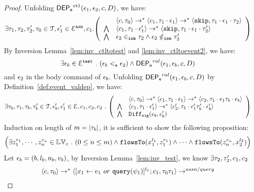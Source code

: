 {\begin{proof}
Unfolding $\mathsf{DEP_{\mathtt{e}}}^{\mathtt{{ctl}}}(\mathtt{\epsilon}_1, \mathtt{\epsilon}_2, c, D)$, we have:
%
\[
\exists \vtrace_1, \vtrace_2, \vtrace_2', \vtrace_0 \in \mathcal{T}, 
\event_1' \in \eventset^{\asn}, {c}_1.
\left(
\begin{array}{ll}   
  & \config{{c}, \vtrace_0} \rightarrow^{*} 
    \config{{c}_1, \vtrace_1 \cdot \event_1}  \rightarrow^{*} 
    \config{\eskip,  \vtrace_1 \cdot \event_1 \cdot \vtrace_2} 
  \\ 
  \bigwedge &
  \config{{c}_1, \vtrace_1 \cdot \event_1'}  \rightarrow^{*} 
  \config{\eskip,  \vtrace_1 \cdot \event_1 \cdot \vtrace_2' } 
  \\
  \bigwedge &
  \event_2 \ismin \vtrace_2 \land \event_2 \notismin \vtrace_2'
\end{array}
\right)
 \]
 By {Inversion Lemma~\ref{lem:inv_ctltotest} and \ref{lem:inv_ctltoevent2}}, we have:
 \[
   \exists \mathtt{\epsilon}_b \in \mathcal{E}^{\mathtt{{test}}} ~.~ (\mathtt{\epsilon}_b <_{\mathtt{e}} \mathtt{\epsilon}_2) \land \mathsf{DEP_{\mathtt{e}}}^{val}(\mathtt{\epsilon}_1, \mathtt{\epsilon}_b, c, D)
 \]
 and $\mathtt{\epsilon}_2$ in the body command of $\mathtt{\epsilon}_b$.
 Unfolding $\mathsf{DEP_{\mathtt{e}}}^{val}(\mathtt{\epsilon}_1, \mathtt{\epsilon}_b, c, D)$ by Definition~\ref{def:event_valdep}, we have:
\[
\exists \vtrace_0, \vtrace_1, \vtrace_b, \vtrace_b' \in \mathcal{T},  \event_b', \event_1' \in \eventset, 
{c}_1, {c}_2, {c}_2 \st
  \left(
  \begin{array}{ll}   
 & \config{{c}, \vtrace_0} \rightarrow^{*} 
  \config{{c}_1, \vtrace_1 \cdot \event_1}  \rightarrow^{*} 
  \config{{c}_2,  \vtrace_1 \cdot \event_1 \vtrace_b \cdot \event_b } 
  \\ 
  \bigwedge &
  \config{{c}_1, \vtrace_1 \cdot \event_1'}  \rightarrow^{*} 
  \config{{c}_2',  \vtrace_1 \cdot \event_1' \vtrace_b' \cdot \event_b' } 
  \\
  \bigwedge &
   \ismdiff(\event_b,\event_b')
\end{array}
\right)
 \]
Induction on length of $m = |\mathtt{\tau}_b|$, it is sufficient to show the following proposition:
%
\[
\Big(\exists z_1^{r_1}, \cdots, z_n^{r_n} \in \mathbb{LV}_{{c}} ~.~ (0 \leq n \leq m )
 \land \mathtt{flowsTo}(x_1^{l_1}, z_1^{r_1}) \land \cdots \land \mathtt{flowsTo}(z_n^{r_n}, {x}_2^{l_2}) \Big)
\]
%
 Let $\mathtt{\epsilon}_b = (b, l_b, n_b, v_b)$, by {Inversion Lemma~\ref{lem:inv_test}},
we know $\exists \mathtt{\tau}_2, \mathtt{\tau}_2', {c}_1, {c}_2$
 \[
  \begin{array}{l}   
  \langle {c}, \mathtt{\tau}_0 \rangle 
  \rightarrow^{*} 
  \langle [\mathrel{ {x}_1 \leftarrow e_1~ or ~ {\tt query}(\psi_1) }]^{l_1} ; {c}_1, \mathtt{\tau}_0 \mathtt{\tau}_1 \rangle  \rightarrow^{assn/query}

\end{array}\]
\end{proof}}
